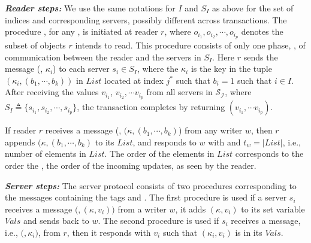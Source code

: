 \textit{\textbf{Reader steps:}}  
We use the same notations for $I$ and $S_I$ as above for the set of indices and corresponding servers, possibly 
different across transactions.
The procedure  , 
for any  \rot{}, 
is  initiated at  reader  $r$, where   $o_{i_1},  o_{i_2}, \cdots, o_{i_p}$  denotes the  subset  of  
objects $r$ 
intends to read. This procedure
consists of only one phase,  {\readValue},  of communication 
between the reader and the servers in $S_I$.   Here $r$ sends  the message
(\readValueTag, ${\kappa}_i$) to each server $s_i \in S_I$, where 
the ${\kappa}_i$ is the key in  the tuple $({\kappa}_{i}, (b_{1}, \cdots, b_{k}))$  in  $List$ located at  index $j^*$ such that $b_i =1$ such that 
$i \in I$. %
After
receiving the values $v_{i_1}$, $v_{i_2}, \cdots v_{i_p}$ from all  servers in $\mathcal{S_I}$,  where $S_I \triangleq \{s_{i_1},  s_{i_2}, \cdots, s_{i_p}\}$, the transaction completes by 
returning $(v_{i_1}, \cdots v_{i_p})$.

If  reader $r$ receives a message  
(\informReaderTag, $({\kappa}, (b_{1}, \cdots, b_{k})$) from any writer $w$, then $r$ appends  
$({\kappa}, (b_{1}, \cdots, b_{k})$ to its  $List$,  and responds to $w$ with  
{\ackTag} and $t_w = |List|$, i.e., number of elements in $List$.
The order of the  elements in  $List$ corresponds to  the order  
the \wots{}, the order of the incoming  {\informReaderTag} updates,  as seen by the reader.


\textit{\textbf{Server steps:}} The server protocol consists of two procedures corresponding to the messages containing the tags 
{\writeValueTag} and \readValueTag.  The first procedure is used if a server $s_i$ receives a 
message  $(${\writeValueTag}$, ({\kappa}, v_{i}))$  from a writer $w$,  it  adds $({\kappa}, v_i)$ to its set variable   $Vals$ and sends {\ackTag} back to $w$.
The second procedure is used  if  $s_i$ receives a message, i.e., $(${\readValueTag}$, {\kappa}_{i})$, from $r$, then it responds with $v_i$ such that $({\kappa}_{i}, v_i)$ is in its $Vals$.

